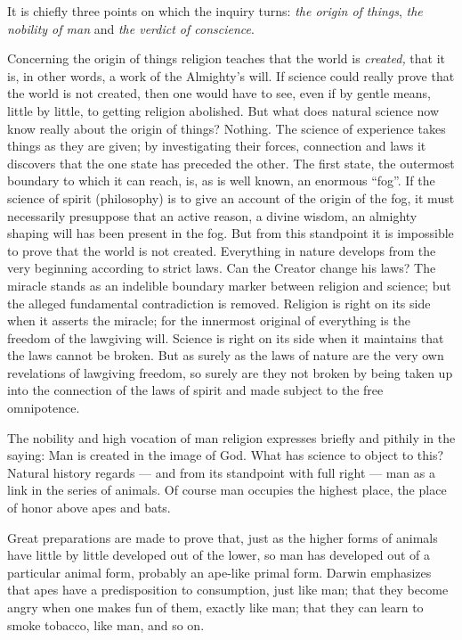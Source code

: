 \documentclass[12pt,a4paper,openany]{book}
\newcommand{\opage}[1]{\marginnote{\footnotesize\textit{[#1]}}}
\begin{document}
It is chiefly three points on which the inquiry
turns: \emph{the origin of things}, \emph{the nobility
of man} and \emph{the verdict of conscience}.

Concerning the origin of things religion teaches that the world
is \emph{created,} that it is, in other words, a work of the Almighty's
will. If science could really
prove that the world is not created, then one would have to see, even
if by gentle means, little by little, to getting
religion abolished. But what does natural science now know
really about the origin of things? Nothing. The science of experience
takes things as they are given; by investigating
their forces, connection and laws it discovers that
the one state has preceded the other. The
\setcounter{footnote}{0}%
\opage{63}first state, the outermost boundary to which it can
reach, is, as is well known, an enormous ``fog''. If the science of spirit
(philosophy) is to give an account of the origin of the fog,
it must necessarily presuppose that an active
reason, a divine wisdom, an almighty
shaping will has been present in the fog. But
from this standpoint it is impossible to prove that the
world is not created. Everything in nature develops from
the very beginning according to strict laws. Can the Creator
change his laws? The miracle stands as an indelible
boundary marker between religion and science; but the
alleged fundamental contradiction is removed. Religion is
right on its side when it asserts the miracle; for the
innermost original of everything is the freedom of the
lawgiving will. Science is right on its side when it
maintains that the laws cannot be broken. But as
surely as the laws of nature are the very own
revelations of lawgiving freedom, so surely are they not broken by being taken up into
the connection of the laws of spirit and made subject to the free
omnipotence.

The nobility and high vocation of man
religion expresses briefly and pithily in the saying: Man is
created in the image of God. What has science to
object to this? Natural history regards --- and from its
standpoint with full right --- man as a link in
the series of animals. Of course man occupies the
highest place, the place of honor above apes and bats.


Great preparations are made to prove that, just as
the higher forms of animals have little by little developed
out of the lower, so man has developed
out of a particular animal form, probably an ape-like primal form.
\setcounter{footnote}{0}%
\opage{64}Darwin emphasizes that apes have a predisposition to
consumption, just like man; that they become angry when
one makes fun of them, exactly like man; that
they can learn to smoke tobacco, like man, and so on.
\end{document}
